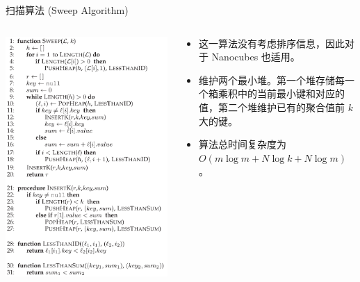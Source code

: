 \documentclass[10pt,aspectratio=169]{ctexbeamer}
\begin{document}
\begin{frame}{扫描算法 (Sweep Algorithm)}
    \begin{columns}
        \begin{column}{.3\textwidth}
            \includegraphics[width=\textwidth]{pic/sweep.png}
        \end{column}
        \begin{column}{.7\textwidth}\pause
            \begin{itemize}[<+->]
                \item 这一算法没有考虑排序信息，因此对于 Nanocubes 也适用。
                \item 维护两个最小堆。第一个堆存储每一个箱乘积中的当前最小键和对应的值，第二个堆维护已有的聚合值前 $k$ 大的键。
                \item 算法总时间复杂度为 $O(m \log m + N\log k + N\log m)$。
            \end{itemize}
        \end{column}
    \end{columns}
\end{frame}
\end{document}
